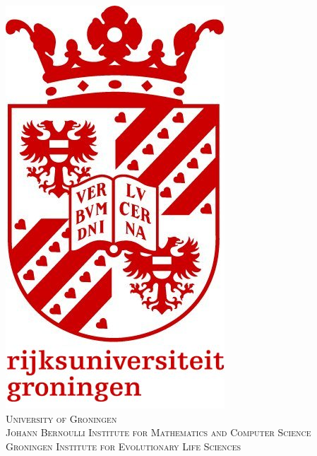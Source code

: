 \documentclass[letterpaper,12pt]{report} %
\begin{document}
\begin{titlepage}

\newcommand{\HRule}{\rule{\linewidth}{0.5mm}} %

\center %
 
\includegraphics[scale=0.2]{Pictures/logo.jpg}\\[0.1cm] 
\textsc{\LARGE University of Groningen}\\[1.5cm] %

\textsc{\large Johann Bernoulli Institute for Mathematics and Computer Science}\\[0.5cm] %
\textsc{\large Groningen Institute for Evolutionary Life Sciences}\\[0.5cm] %



\end{titlepage}
\end{document}
